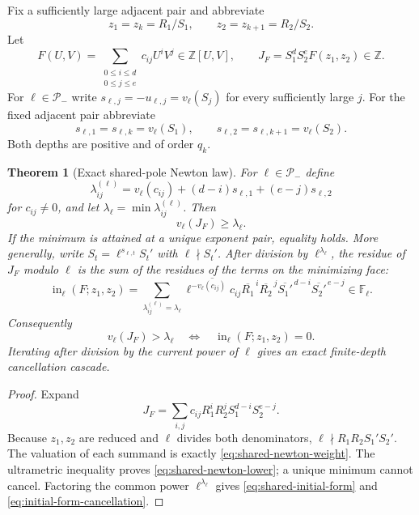 \documentclass[11pt,oneside]{article}
\newtheorem{theorem}{Theorem}[section]
\theoremstyle{definition}
\theoremstyle{remark}
\newcommand{\Z}{\mathbb Z}
\begin{document}
Fix a sufficiently large adjacent pair and abbreviate
\[
 z_1=z_k=R_1/S_1,\qquad z_2=z_{k+1}=R_2/S_2.
\]
Let
\begin{equation}
 F(U,V)=\sum_{\substack{0\le i\le d\\0\le j\le e}}c_{ij}U^iV^j\in\Z[U,V],
 \qquad
 J_F=S_1^dS_2^eF(z_1,z_2)\in\Z.
 \label{eq:shared-cleared-mask}
\end{equation}
For $\ell\in\mathcal P_-$ write $s_{\ell,j}=-u_{\ell,j}=v_\ell(S_j)$ for every
sufficiently large $j$.  For the fixed adjacent pair abbreviate
\begin{equation}
 s_{\ell,1}=s_{\ell,k}=v_\ell(S_1),
 \qquad
 s_{\ell,2}=s_{\ell,k+1}=v_\ell(S_2).
 \label{eq:shared-pole-depths}
\end{equation}
Both depths are positive and of order $q_k$.

\begin{theorem}[Exact shared-pole Newton law]
\label{thm:shared-pole-newton}
For $\ell\in\mathcal P_-$ define
\begin{equation}
 \lambda_{ij}^{(\ell)}
 =v_\ell(c_{ij})+(d-i)s_{\ell,1}+(e-j)s_{\ell,2}
 \label{eq:shared-newton-weight}
\end{equation}
for $c_{ij}\ne0$, and let $\lambda_\ell=\min\lambda_{ij}^{(\ell)}$.  Then
\begin{equation}
 v_\ell(J_F)\ge\lambda_\ell.
 \label{eq:shared-newton-lower}
\end{equation}
If the minimum is attained at a unique exponent pair, equality holds.
More generally, write $S_t=\ell^{s_{\ell,t}}S_t'$ with $\ell\nmid S_t'$.  After division by
$\ell^{\lambda_\ell}$, the residue of $J_F$ modulo $\ell$ is the sum of the residues of the
terms on the minimizing face:
\begin{equation}
 \operatorname{in}_{\ell}(F;z_1,z_2)
 =\sum_{\lambda_{ij}^{(\ell)}=\lambda_\ell}
 \overline{\ell^{-v_\ell(c_{ij})}c_{ij}}
 \overline{R_1}^{\,i}\overline{R_2}^{\,j}
 \overline{S_1'}^{\,d-i}\overline{S_2'}^{\,e-j}
 \in\mathbb F_\ell.
 \label{eq:shared-initial-form}
\end{equation}
Consequently
\begin{equation}
 v_\ell(J_F)>\lambda_\ell
 \quad\Longleftrightarrow\quad
 \operatorname{in}_{\ell}(F;z_1,z_2)=0.
 \label{eq:initial-form-cancellation}
\end{equation}
Iterating after division by the current power of $\ell$ gives an exact finite-depth
cancellation cascade.
\end{theorem}

\begin{proof}
Expand
\[
 J_F=\sum_{i,j}c_{ij}R_1^iR_2^jS_1^{d-i}S_2^{e-j}.
\]
Because $z_1,z_2$ are reduced and $\ell$ divides both denominators,
$\ell\nmid R_1R_2S_1'S_2'$.  The valuation of each summand is exactly
\eqref{eq:shared-newton-weight}.  The ultrametric inequality proves
\eqref{eq:shared-newton-lower}; a unique minimum cannot cancel.  Factoring the common power
$\ell^{\lambda_\ell}$ gives \eqref{eq:shared-initial-form} and
\eqref{eq:initial-form-cancellation}.
\end{proof}
\end{document}
